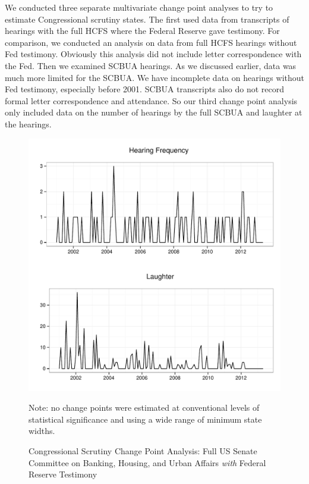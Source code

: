 \documentclass[a4paper]{article}\usepackage[]{graphicx}\usepackage[]{color}
\newenvironment{knitrout}{}{} %
\begin{document}
We conducted three separate multivariate change point analyses to try to estimate Congressional scrutiny states. The first used data from transcripts of hearings with the full HCFS where the Federal Reserve gave testimony. For comparison, we conducted an analysis on data from full HCFS hearings without Fed testimony. Obviously this analysis did not include letter correspondence with the Fed. Then we examined SCBUA hearings. As we discussed earlier, data was much more limited for the SCBUA. We have incomplete data on hearings without Fed testimony, especially before 2001. SCBUA transcripts also do not record formal letter correspondence and attendance. So our third change point analysis only included data on the number of hearings by the full SCBUA and laughter at the hearings.

\begin{figure}
    \caption{Congressional Scrutiny Change Point Analysis: Full US Senate Committee on Banking, Housing, and Urban Affairs \emph{with} Federal Reserve Testimony}
    \label{fig:SenateFedCP}
\begin{knitrout}
\color{fgcolor}

{\centering \includegraphics[width=0.8\linewidth]{figure/ScrutinySenate} 

}



\end{knitrout}
{\scriptsize{Note: no change points were estimated at conventional levels of statistical significance and using a wide range of minimum state widths.}}
\end{figure}
\end{document}
